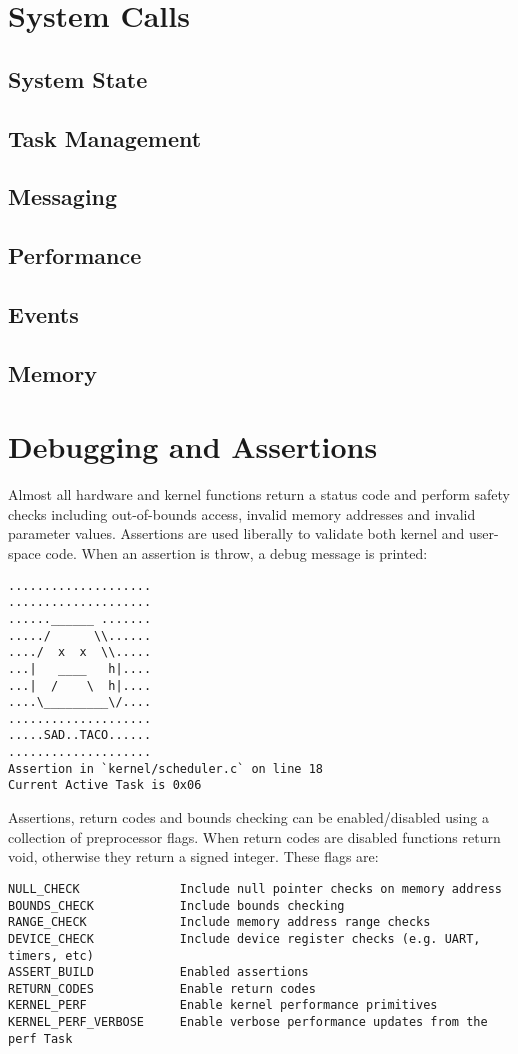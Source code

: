 \documentclass[twoside,a4paper]{refart}
\begin{document}
\section{System Calls}
\subsection{System State}
\subsection{Task Management}
\subsection{Messaging}
\subsection{Performance}
\subsection{Events}
\subsection{Memory}

\section{Debugging and Assertions}
 Almost all hardware and kernel functions return a status code and perform safety checks including out-of-bounds access, invalid memory addresses and invalid parameter values. Assertions are used liberally to validate both kernel and user-space code. When an assertion is throw, a debug message is printed:

\begin{verbatim}
....................
....................
......______ .......
...../      \\......
..../  x  x  \\.....
...|   ____   h|....
...|  /    \  h|....
....\_________\/....
....................
.....SAD..TACO......
....................
Assertion in `kernel/scheduler.c` on line 18
Current Active Task is 0x06
\end{verbatim}

Assertions, return codes and bounds checking can be enabled/disabled using a collection of preprocessor flags. When return codes are disabled functions return void, otherwise they return a signed integer. These flags are:\\
\begin{verbatim}
NULL_CHECK              Include null pointer checks on memory address
BOUNDS_CHECK            Include bounds checking
RANGE_CHECK             Include memory address range checks
DEVICE_CHECK            Include device register checks (e.g. UART, timers, etc)
ASSERT_BUILD            Enabled assertions
RETURN_CODES            Enable return codes
KERNEL_PERF             Enable kernel performance primitives
KERNEL_PERF_VERBOSE     Enable verbose performance updates from the perf Task
\end{verbatim}
\end{document}
